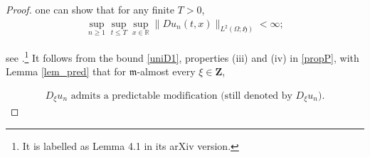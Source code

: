 \documentclass[letterpaper, 11pt,  reqno]{amsart}
\newcommand{\noi}{\noindent}
\newcommand{\R}{\mathbb{R}}
\renewcommand{\O}{\Omega}
\newcommand{\fm}{\mathfrak{m}}
\newcommand{\fH}{\mathfrak{H}}
\numberwithin{equation}{section}
\numberwithin{theorem}{section}
\begin{document}
\begin{proof}
 \noi
 one can   show that for any finite $T>0$,
 \begin{align}\label{uniD1}
\sup_{n\geq 1} \sup_{t\leq T}\sup_{x\in\R} \big\| Du_n(t,x)\big\|_{L^2(\O;\fH)}   < \infty;
\end{align}


\noi
see \cite[Lemma 12]{BN17}.\footnote{It is labelled as Lemma 4.1 in its arXiv version.}
It follows from the bound \eqref{uniD1},  properties (iii) and (iv) in \eqref{propP}, with Lemma \ref{lem_pred}
that for $\fm$-almost every $\xi\in\mathbf{Z}$,

\noi
\begin{align} \label{D_xMOD}
\text{$D_\xi u_n$ admits a predictable modification (still denoted by $D_\xi u_n$).} 
\end{align}




\end{proof}
\end{document}
